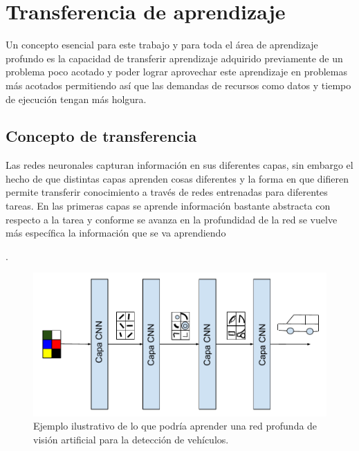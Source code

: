 
\chapter{Transferencia de aprendizaje} %

\label{Chapter3} %

Un concepto esencial para este trabajo y para toda el área de aprendizaje profundo es la capacidad de transferir aprendizaje adquirido previamente de un problema poco acotado y poder lograr aprovechar este aprendizaje en problemas más acotados permitiendo así que las demandas de recursos como datos y tiempo de ejecución tengan más holgura.

\section{Concepto de transferencia}

Las redes neuronales capturan información en sus diferentes capas, sin embargo el hecho de que distintas capas aprenden cosas diferentes y la forma en que difieren permite transferir conocimiento a través de redes entrenadas para diferentes tareas. En las primeras capas se aprende información bastante abstracta con respecto a la tarea y conforme se avanza en la profundidad de la red se vuelve más específica la información que se va aprendiendo

.

\begin{figure}
\includegraphics[scale=1]{Figures/learnbylayer.pdf}
\caption{Ejemplo ilustrativo de lo que podría aprender una red profunda de visión artificial para la detección de vehículos.}
\label{fig:learnbylayer}
\end{figure}

